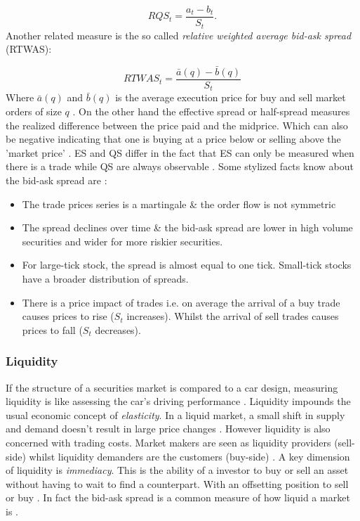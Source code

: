 \documentclass{kththesis}
\theoremstyle{definition}
\begin{document}
\begin{equation*}
    RQS_t = \frac{a_t - b_t}{S_t}.
\end{equation*}
Another related measure is the so called \textit{relative weighted average bid-ask spread} (RTWAS):

\begin{equation}
\label{eq:4}
    RTWAS_{t} = \frac{\bar{a}(q) - \bar{b}(q)}{S_t}
\end{equation}
Where $\bar{a}(q)$ and $\bar{b}(q)$ is the average execution price for buy and sell market orders of size $q$ \parencite{foucault2013market}. On the other hand the effective spread or half-spread measures the realized difference between the price paid and the midprice. Which can also be negative indicating that one is buying at a price below or selling above the 'market price' \parencite{cartea2015algorithmic}. ES and QS differ in the fact that ES can only be measured when there is a trade while QS are always observable \parencite{cartea2015algorithmic}. Some stylized facts know about the bid-ask spread are \parencite{hasbrouck2007empirical, madhavan2002market, bouchaud2018trades}:
\begin{itemize}
    \item The trade prices series is a martingale \& the order flow is not symmetric
    \item The spread declines over time \& the bid-ask spread are lower in high volume securities and wider for more riskier securities.
    \item For large-tick stock, the spread is almost equal to one tick. Small-tick stocks have a broader distribution of spreads.
    \item There is a price impact of trades i.e. on average the arrival of a buy trade causes prices to rise ($S_t$ increases). Whilst the arrival of sell trades causes prices to fall ($S_t$ decreases).
\end{itemize}

\subsubsection*{Liquidity}
If the structure of a securities market is compared to a car design, measuring liquidity is like assessing the car's driving performance \parencite{foucault2013market}. Liquidity impounds the usual economic concept of \textit{elasticity}. In a liquid market, a small shift in supply and demand doesn't result in large price changes \parencite{hasbrouck2007empirical}. However liquidity is also concerned with trading costs. Market makers are seen as liquidity providers (sell-side) whilst liquidity demanders are the customers (buy-side) \parencite{hasbrouck2007empirical}. A key dimension of liquidity is \textit{immediacy}. This is the ability of a investor to buy or sell an asset without having to wait to find a counterpart. With an offsetting position to sell or buy \parencite{cartea2015algorithmic}. In fact the bid-ask spread is a common measure of how liquid a market is \parencite{foucault2013market}.
\end{document}
